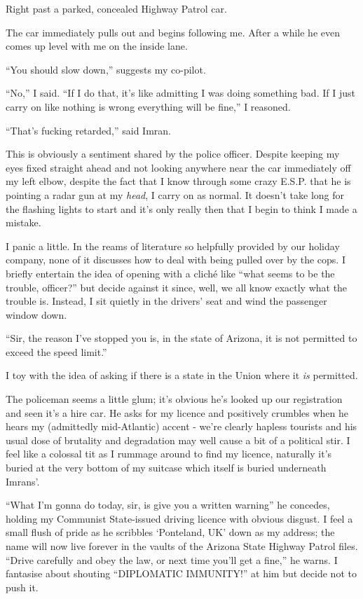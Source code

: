 \documentclass[a5paper,10pt,titlepage,draft]{book}
\begin{document}
Right past a parked, concealed Highway Patrol car.

The car immediately pulls out and begins following me.  After a while he even comes up level with me on the inside lane.

``You should slow down,'' suggests my co-pilot.

``No,'' I said.  ``If I do that, it's like admitting I was doing something bad.  If I just carry on like nothing is wrong everything will be fine,'' I reasoned.

``That's fucking retarded,'' said Imran.

This is obviously a sentiment shared by the police officer.  Despite keeping my eyes fixed straight ahead and not looking anywhere near the car immediately off my left elbow, despite the fact that I know through some crazy E.S.P. that he is pointing a radar gun at my \emph{head}, I carry on as normal.  It doesn't take long for the flashing lights to start and it's only really then that I begin to think I made a mistake.

I panic a little.  In the reams of literature so helpfully provided by our holiday company, none of it discusses how to deal with being pulled over by the cops.  I briefly entertain the idea of opening with a clich\'{e} like ``what seems to be the trouble, officer?'' but decide against it since, well, we all know exactly what the trouble is.  Instead, I sit quietly in the drivers' seat and wind the passenger window down.

``Sir, the reason I've stopped you is, in the state of Arizona, it is not permitted to exceed the speed limit.''

I toy with the idea of asking if there is a state in the Union where it \emph{is} permitted.

The policeman seems a little glum; it's obvious he's looked up our registration and seen it's a hire car.  He asks for my licence and positively crumbles when he hears my (admittedly mid-Atlantic) accent - we're clearly hapless tourists and his usual dose of brutality and degradation may well cause a bit of a political stir.  I feel like a colossal tit as I rummage around to find my licence, naturally it's buried at the very bottom of my suitcase which itself is buried underneath Imrans'.

``What I'm gonna do today, sir, is give you a written warning'' he concedes, holding my Communist State-issued driving licence with obvious disgust.  I feel a small flush of pride as he scribbles `Ponteland, UK' down as my address; the name will now live forever in the vaults of the Arizona State Highway Patrol files.  ``Drive carefully and obey the law, or next time you'll get a fine,'' he warns.  I fantasise about shouting ``DIPLOMATIC IMMUNITY!'' at him but decide not to push it.
\end{document}
